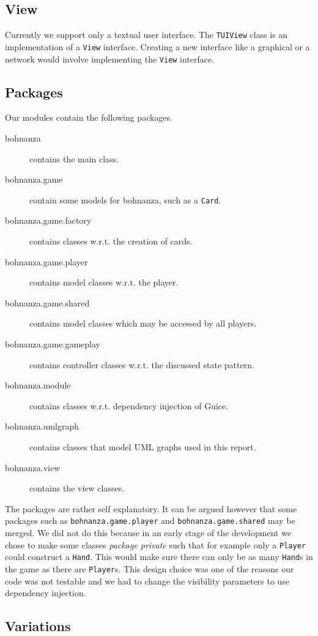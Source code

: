 \subsection{View}
Currently we support only a textual user interface. The \texttt{TUIView} class is an implementation
of a \texttt{View} interface. Creating a new interface like a graphical or a network would involve
implementing the \texttt{View} interface.

\subsection{Packages}
Our modules contain the following packages.
\begin{description}
\item[bohnanza] contains the main class.
\item[bohnanza.game] contain some models for bohnanza, such as a \texttt{Card}.
\item[bohnanza.game.factory] contains classes w.r.t. the creation of cards.
\item[bohnanza.game.player] contains model classes w.r.t. the player.
\item[bohnanza.game.shared] contains model classes which may be accessed by all players.
\item[bohnanza.game.gameplay] contains controller classes w.r.t. the discussed state pattern.
\item[bohnanza.module] contains classes w.r.t. dependency injection of Guice.
\item[bohnanza.umlgraph] contains classes that model UML graphs used in this report.
\item[bohnanza.view] contains the view classes.
\end{description}

The packages are rather self explanatory. It can be argued however that some packages such as \texttt{bohnanza.game.player} and
\texttt{bohnanza.game.shared} may be merged. We did not do this because in an early stage of the development we chose to make some classes
\emph{package private} such that for example only a \texttt{Player} could construct a \texttt{Hand}. This would make sure there can only be as many \texttt{Hand}s in
the game as there are \texttt{Player}s. This design choice was one of the reasons our code was not testable and we had to change the visibility
parameters to use dependency injection.

\subsection{Variations}

